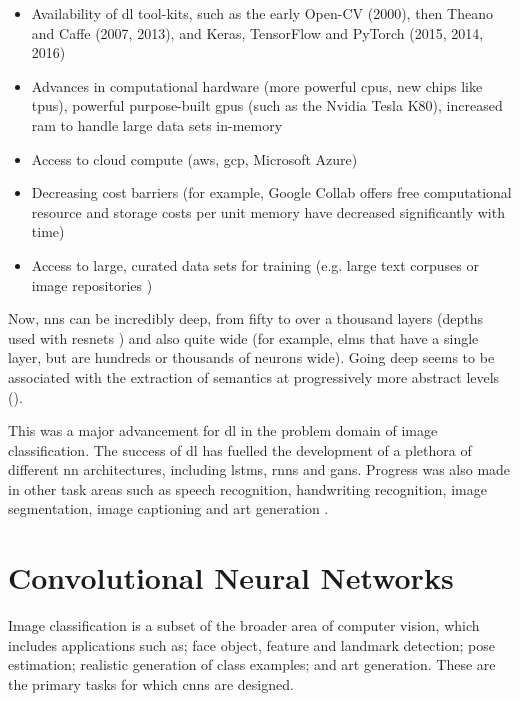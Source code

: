 \begin{itemize}
    \item Availability of \gls{dl} tool-kits, such as the early Open-CV (2000), then Theano and Caffe (2007, 2013), and Keras, TensorFlow and PyTorch (2015, 2014, 2016)
    \item Advances in computational hardware (more powerful \gls{cpu}s, new chips like \gls{tpu}s), powerful purpose-built \gls{gpu}s (such as the Nvidia Tesla K80), increased \gls{ram} to handle large data sets in-memory
    \item Access to cloud compute (\gls{aws}, \gls{gcp}, Microsoft Azure) 
    \item Decreasing cost barriers (for example, Google Collab offers free computational resource and storage costs per unit memory have decreased significantly with time)
    \item Access to large, curated data sets for training (e.g. large text corpuses \cite{enron_emails} or image repositories \cite{image_net}) 
\end{itemize}

Now, \gls{nn}s can be incredibly deep, from fifty to over a thousand layers (depths used with \gls{resnet}s \cite{resnet}) and also quite wide (for example, \gls{elm}s that have a single layer, but are hundreds or thousands of neurons wide). Going deep seems to be associated with the extraction of semantics at progressively more abstract levels (\cite{cnn_semantic}). 
\bigskip

This was a major advancement for \gls{dl} in the problem domain of image classification. The success of \gls{dl} has fuelled the development of a plethora of different \gls{nn} architectures, including \gls{lstm}s, \gls{rnn}s and \gls{gan}s. Progress was also made in other task areas such as speech recognition, handwriting recognition, image segmentation, image captioning and art generation \cite{dl_overview}. 
\bigskip %
 
\bigskip %

\section{Convolutional Neural Networks}
Image classification is a subset of the broader area of computer vision, which includes applications such as; face object, feature and landmark detection; pose estimation; realistic generation of class examples; and art generation. These are the primary tasks for which \gls{cnn}s are designed.

